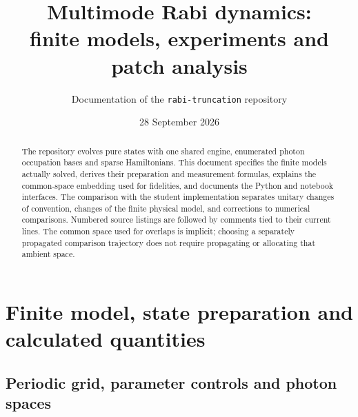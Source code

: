 \documentclass[11pt,a4paper]{article}
\title{Multimode Rabi dynamics:\\finite models, experiments and patch analysis}
\author{Documentation of the \texttt{rabi-truncation} repository}
\date{28 September 2026}
\newcommand{\code}[1]{\texttt{\detokenize{#1}}}
\begin{document}
\maketitle
\begin{abstract}
The repository evolves pure states with one shared engine, enumerated photon
occupation bases and sparse Hamiltonians. This document specifies the finite
models actually solved, derives their preparation and measurement formulas,
explains the common-space embedding used for fidelities, and documents the
Python and notebook interfaces. The comparison with the student implementation
separates unitary changes of convention, changes of the finite physical model,
and corrections to numerical comparisons. Numbered source listings are followed
by comments tied to their current lines. The common \code{full} space used for
overlaps is implicit; choosing a separately propagated comparison trajectory
does not require propagating or allocating that ambient space.
\end{abstract}
\tableofcontents

\section{Finite model, state preparation and calculated quantities}
\subsection{Periodic grid, parameter controls and photon spaces}
\end{document}

